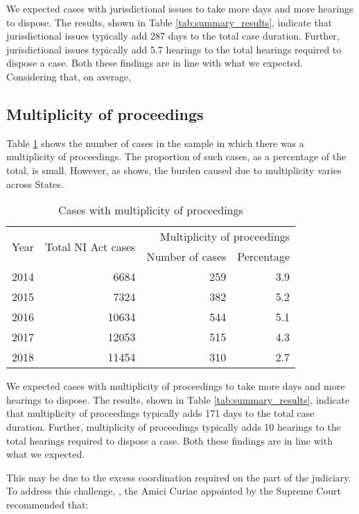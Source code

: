 We expected cases with jurisdictional issues to take more days and more hearings to dispose. The results, shown in Table \ref{tab:summary_results}, indicate that jurisdictional issues typically add 287 days to the total case duration. Further, jurisdictional issues typically add 5.7 hearings to the total hearings required to dispose a case. Both these findings are in line with what we expected. Considering that, on average, 

\subsection{Multiplicity of proceedings}
\label{sec:mult-proc}

Table \ref{tab:mult_yearWise} shows the number of cases in the sample in which there was a multiplicity of proceedings. The proportion of such cases, as a percentage of the total, is small. However, as  shows, the burden caused due to multiplicity varies across States.

\begin{longtable}[h!]{@{}lrrr@{}}
  \caption{Cases with multiplicity of proceedings}\label{tab:mult_yearWise}\\
\toprule
\multirow{2}{*}{Year} &  \multirow{2}{*}{Total NI Act cases} & \multicolumn{2}{p{4cm}}{Multiplicity of proceedings}\\
\cmidrule{3-4}
&& Number of cases & Percentage \\
\midrule\endhead
2014 &   6684 &  259 &   3.9 \\
2015 &   7324 &  382 &   5.2 \\
2016 &  10634 &  544 &   5.1 \\
2017 &  12053 &  515 &   4.3 \\
2018 &  11454 &  310 &   2.7 \\
\bottomrule
\end{longtable}

We expected cases with multiplicity of proceedings to take more days and more hearings to dispose. The results, shown in Table \ref{tab:summary_results}, indicate that multiplicity of proceedings typically adds 171 days to the total case duration. Further, multiplicity of proceedings typically adds 10 hearings to the total hearings required to dispose a case. Both these findings are in line with what we expected.

This may be due to the excess coordination required on the part of the judiciary. To address this challenge, , the Amici Curiae appointed by the Supreme Court recommended that:

